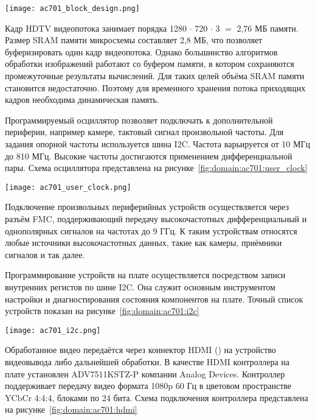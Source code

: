 \begin{center}
  \centering
  \texttt{[image: ac701\_block\_design.png]}
  \label{fig:domain:ac701:block_design}
\end{center}

Кадр HDTV видеопотока занимает порядка 1280 $\cdot$ 720 $\cdot$ 3 $=$ 2,76 МБ памяти. Размер SRAM памяти
микросхемы составляет 2,8 МБ, что позволяет буферизировать один кадр видеопотока. Однако большинство
алгоритмов обработки изображений работают со буфером памяти, в котором сохраняются промежуточные результаты
вычислений. Для таких целей объёма SRAM памяти становится недостаточно. Поэтому
для временного хранения потока приходящих кадров необходима динамическая память.   %

Программируемый осциллятор позволяет подключать к дополнительной периферии, например камере, тактовый сигнал произвольной частоты.
Для задания опорной частоты используется шина I2C. Частота варьируется от 10 МГц до 810 МГц. Высокие частоты достигаются применением дифференциальной пары.
Схема осциллятора представлена на рисунке~\ref{fig:domain:ac701:user_clock}

\begin{center}
  \centering
  \texttt{[image: ac701\_user\_clock.png]}
  \label{fig:domain:ac701:user_clock}
\end{center}

Подключение произвольных периферийных устройств осуществляется через разъём FMC, поддерживающий передачу
высокочастотных дифференциальный и однополярных сигналов на частотах до 9 ГГц\cite[c. 57]{ac701_user_guide}.
К таким устройствам относятся любые источники высокочастотных данных, такие как камеры, приёмники сигналов и так далее.

Программирование устройств на плате осуществляется посредством записи внутренних регистов по шине I2C. Она служит основным
инструментом настройки и диагностирования состояния компонентов на плате. Точный список устройств показан на
рисунке~\ref{fig:domain:ac701:i2c}

\begin{center}
  \centering
  \texttt{[image: ac701\_i2c.png]}
  \label{fig:domain:ac701:i2c}
\end{center}

Обработанное видео передаётся через коннектор HDMI () на устройство видеовывода либо дальнейшей обработки. В качестве
HDMI контроллера на плате установлен ADV7511KSTZ-P компании Analog Devices. Контроллер поддерживает передачу видео формата 1080p 60 Гц в
цветовом пространстве YCbCr 4:4:4, блоками по 24 бита.
Схема подключения контроллера представлена на рисунке~\ref{fig:domain:ac701:hdmi}

